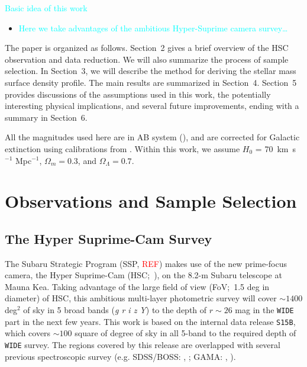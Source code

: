 \documentclass[preprint]{aastex}
\newcommand{\plan}[1]{\textcolor{cyan}{#1}}
\newcommand{\addref}{{\textcolor{red}{REF}}}
\begin{document}
\begin{CJK*}{UTF8}{gbsn}
    \plan{Basic idea of this work}
    \begin{itemize}
        \item \plan{Here we take advantages of the ambitious Hyper-Suprime camera 
            survey\ldots}
    \end{itemize}

    The paper is organized as follows. Section~2 gives a brief overview of the HSC
    observation and data reduction.  We will also summarize the process of sample
    selection.  In Section~3, we will describe the method for deriving the stellar mass 
    surface density profile.  The main results are summarized in Section~4.  Section~5 
    provides discussions of the assumptions used in this work, the potentially interesting
    physical implications, and several future improvements, ending with a summary in
    Section~6.

    All the magnitudes used here are in AB system (\citealt{Oke1983}), and are corrected 
    for Galactic extinction using calibrations from \citet{Schlafly11}.
    Within this work, we assume $H_0$ = 70~km~s$^{-1}$ Mpc$^{-1}$, ${\Omega}_m=0.3$, 
    and ${\Omega}_{\Lambda}=0.7$. 
    

\section{Observations and Sample Selection}

\subsection{The Hyper Suprime-Cam Survey}

    The Subaru Strategic Program (SSP, \addref) makes use of the new prime-focus camera,
    the Hyper Suprime-Cam (HSC;~\citealt{Miyazaki2012}), on the 8.2-m Subaru
    telescope at Mauna Kea.  
    Taking advantage of the large field of view (FoV;~1.5 deg in diameter) of HSC, this
    ambitious multi-layer photometric survey will cover $\sim 1400$ deg$^2$ of sky in 5
    broad bands (\textit{g r i z Y}) to the depth of $r \sim 26$ mag in the \texttt{WIDE}
    part in the next few years.  
    This work is based on the internal data release \texttt{S15B}, which covers $\sim 100$
    square of degree of sky in all 5-band to the required depth of \texttt{WIDE} survey.  
    The regions covered by this release are overlapped with several previous spectroscopic
    survey (e.g. SDSS/BOSS: \citealt{Eisenstein2011}, \citealt{Alam2015}; 
    GAMA: \citealt{Driver2011}, \citealt{Liske2015}).


\end{CJK*}
\end{document}
